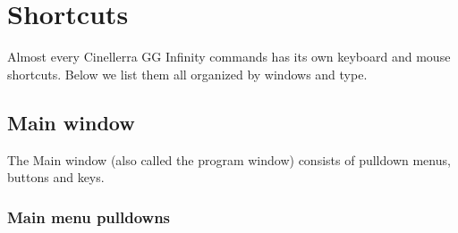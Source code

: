 \chapter{Shortcuts}%
\label{cha:shortcuts}

Almost every Cinellerra GG Infinity commands has its own keyboard and mouse shortcuts. Below we list them all organized by windows and type.

\section{Main window }%
\label{sec:main_window}

The Main window (also called the program window) consists of pulldown menus, buttons and keys.

\subsection{Main menu pulldowns}%
\label{sub:main_menu_pulldowns}

